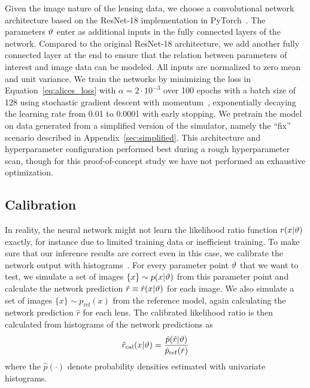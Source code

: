 \documentclass[twocolumn]{aastex63}
\begin{document}
Given the image nature of the lensing data, we choose a convolutional network architecture based on the ResNet-18 \citep{he2016deep} implementation in PyTorch~\citep{paszke2017automatic}. The parameters $\vartheta$ enter as additional inputs in the fully connected layers of the network. Compared to the original ResNet-18 architecture, we add another fully connected layer at the end to ensure that the relation between parameters of interest and image data can be modeled. All inputs are normalized to zero mean and unit variance. We train the networks by minimizing the loss in Equation~\eqref{eq:alices_loss} with $\alpha = 2 \cdot 10^{-3}$ over 100 epochs with a batch size of 128 using stochastic gradient descent with momentum~\citep{Qian:1999:MTG:307343.307376}, exponentially decaying the learning rate from 0.01 to 0.0001 with early stopping. We pretrain the model on data generated from a simplified version of the simulator, namely the ``fix'' scenario described in Appendix~\ref{sec:simplified}. This architecture and hyperparameter configuration performed best during a rough hyperparameter scan, though for this proof-of-concept study we have not performed an exhaustive optimization.

\subsection{Calibration}
\label{sec:lfi-calibration}

In reality, the neural network might not learn the likelihood ratio function $r(x|\vartheta)$ exactly, for instance due to limited training data or inefficient training. To make sure that our inference results are correct even in this case, we calibrate the network output with histograms~\citep{Cranmer:2015bka, 1805.00020}. For every parameter point $\vartheta$ that we want to test, we simulate a set of images $\{x\} \sim p(x|\vartheta)$ from this parameter point and calculate the network prediction $\hat{r} \equiv \hat{r}(x|\vartheta)$ for each image. We also simulate a set of images $\{x\} \sim p_{\mathrm{ref}}(x)$ from the reference model, again calculating the network prediction $\hat{r}$ for each lens. The calibrated likelihood ratio is then calculated from histograms of the network predictions as
%
\begin{equation}
  \hat{r}_\mathrm{cal}(x|\stattheta)
  = \frac {\hat{p}( \hat{r} | \stattheta )} {\hat{p}_\mathrm{ref}(\hat{r})}
\end{equation}
%
where the $\hat{p}(\cdot)$ denote probability densities estimated with univariate histograms.
\end{document}
